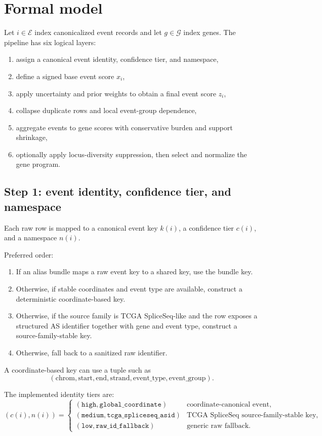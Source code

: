 \documentclass[11pt]{article}
\begin{document}
\section{Formal model}
Let $i \in \mathcal{E}$ index canonicalized event records and let $g \in \mathcal{G}$ index genes. The pipeline has six logical layers:
\begin{enumerate}[leftmargin=2em]
\item assign a canonical event identity, confidence tier, and namespace,
\item define a signed base event score $x_i$,
\item apply uncertainty and prior weights to obtain a final event score $z_i$,
\item collapse duplicate rows and local event-group dependence,
\item aggregate events to gene scores with conservative burden and support shrinkage,
\item optionally apply locus-diversity suppression, then select and normalize the gene program.
\end{enumerate}

\subsection{Step 1: event identity, confidence tier, and namespace}
Each raw row is mapped to a canonical event key $k(i)$, a confidence tier $c(i)$, and a namespace $n(i)$.

Preferred order:
\begin{enumerate}[leftmargin=2em]
\item If an alias bundle maps a raw event key to a shared key, use the bundle key.
\item Otherwise, if stable coordinates and event type are available, construct a deterministic coordinate-based key.
\item Otherwise, if the source family is TCGA SpliceSeq-like and the row exposes a structured AS identifier together with gene and event type, construct a source-family-stable key.
\item Otherwise, fall back to a sanitized raw identifier.
\end{enumerate}

A coordinate-based key can use a tuple such as
\[
(\mathrm{chrom}, \mathrm{start}, \mathrm{end}, \mathrm{strand}, \mathrm{event\_type}, \mathrm{event\_group}).
\]

The implemented identity tiers are:
\[
(c(i), n(i)) =
\begin{cases}
(\texttt{high}, \texttt{global\_coordinate}) & \text{coordinate-canonical event},\\
(\texttt{medium}, \texttt{tcga\_spliceseq\_asid}) & \text{TCGA SpliceSeq source-family-stable key},\\
(\texttt{low}, \texttt{raw\_id\_fallback}) & \text{generic raw fallback.}
\end{cases}
\]
\end{document}
